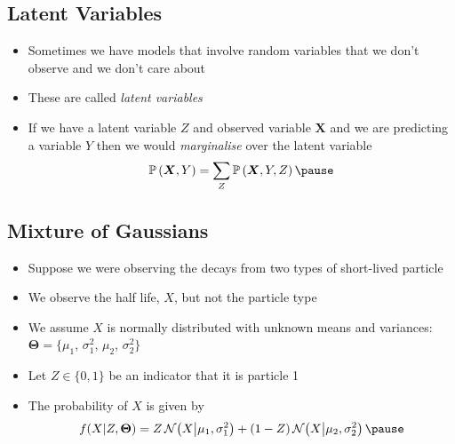 
\begin{slide}
\section{Latent Variables}

\begin{PauseHighLight}
  \begin{itemize}
  \item Sometimes we have models that involve random variables that we
    don't observe and we don't care about\pause
  \item These are called \emph{latent variables}\pause
  \item If we have a latent variable $Z$ and observed variable $\bm{X}$
    and we are predicting a variable $Y$ then we would
    \emph{marginalise} over the latent variable
    \begin{align*}
      \Prob{\bm{X}, Y} = \sum_Z \Prob{\bm{X}, Y, Z}\pause
    \end{align*}
  \end{itemize}
\end{PauseHighLight}

\end{slide}


\begin{slide}
\section{Mixture of Gaussians}

\begin{PauseHighLight}
  \begin{itemize}
  \item Suppose we were observing the decays from two types of
    short-lived particle\pause
  \item We observe the half life, $X$, but not the particle type\pause
  \item We assume $X$ is normally distributed with unknown means and
    variances: $\bm{\Theta} = \{\mu_1$, $\sigma_1^2$, $\mu_2$,
    $\sigma_2^2\}$\pause
  \item Let $Z\in\{0,1\}$ be an indicator that it is particle 1\pause
  \item The probability of $X$ is given by
    \begin{align*}
      f(X|Z,\bm{\Theta}) = Z\,\normal{X\big|\mu_1,\sigma_1^2} +
      (1-Z)\,\normal{X\big|\mu_2,\sigma_2^2}\pause
    \end{align*}
  \end{itemize}
\end{PauseHighLight}

\end{slide}


